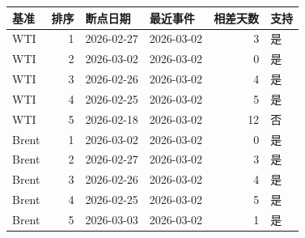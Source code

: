\begin{tabular}{lrllrl}
\toprule
基准 & 排序 & 断点日期 & 最近事件 & 相差天数 & 支持 \\
\midrule
WTI & 1 & 2026-02-27 & 2026-03-02 & 3 & 是 \\
WTI & 2 & 2026-03-02 & 2026-03-02 & 0 & 是 \\
WTI & 3 & 2026-02-26 & 2026-03-02 & 4 & 是 \\
WTI & 4 & 2026-02-25 & 2026-03-02 & 5 & 是 \\
WTI & 5 & 2026-02-18 & 2026-03-02 & 12 & 否 \\
Brent & 1 & 2026-03-02 & 2026-03-02 & 0 & 是 \\
Brent & 2 & 2026-02-27 & 2026-03-02 & 3 & 是 \\
Brent & 3 & 2026-02-26 & 2026-03-02 & 4 & 是 \\
Brent & 4 & 2026-02-25 & 2026-03-02 & 5 & 是 \\
Brent & 5 & 2026-03-03 & 2026-03-02 & 1 & 是 \\
\bottomrule
\end{tabular}
